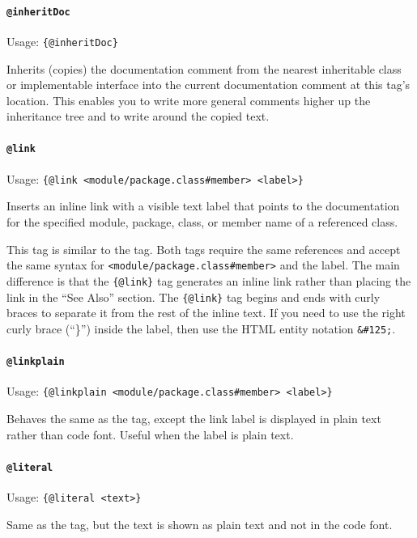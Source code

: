 \documentclass[11pt,a4paper, titlepage, parskip=half, headsepline, footsepline, cleardoublepage=current, headheight=1cm]{scrbook}
\begin{document}
\paragraph{\lstinline|@inheritDoc|}\label{sec:TagInheritDoc}  Usage: \lstinline|{@inheritDoc}|

Inherits (copies) the documentation comment from the nearest inheritable class or implementable interface into the current documentation comment at this tag's location. This enables you to write more general comments higher up the inheritance tree and to write around the copied text.

\paragraph{\lstinline|@link|}\label{sec:TagLink}  Usage: \lstinline|{@link <module/package.class#member> <label>}|

Inserts an inline link with a visible text label that points to the documentation for the specified module, package, class, or member name of a referenced class. 

This tag is similar to the  tag. Both tags require the same references and accept the same syntax for \verb|<module/package.class#member>| and the label. The main difference is that the \lstinline|{@link}| tag generates an inline link rather than placing the link in the “See Also” section. The \lstinline|{@link}| tag begins and ends with curly braces to separate it from the rest of the inline text. If you need to use the right curly brace (“\}”) inside the label, then use the HTML entity notation \verb|&#125;|.

\paragraph{\lstinline|@linkplain|}\label{sec:TagLinkplain}  Usage: \lstinline|{@linkplain <module/package.class#member> <label>}|

Behaves the same as the  tag, except the link label is displayed in plain text rather than code font. Useful when the label is plain text.

\paragraph{\lstinline|@literal|}\label{sec:TagLiteral}  Usage: \lstinline|{@literal <text>}| 

Same as the  tag, but the text is shown as plain text and not in the code font.
\end{document}
